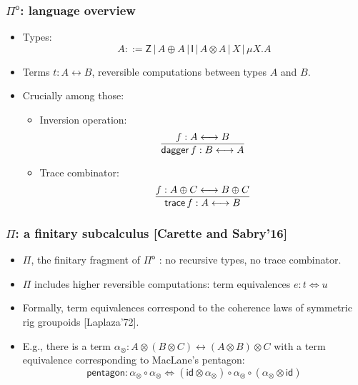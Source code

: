 \documentclass[12pt,t]{beamer}
\newcommand{\Pio}{\ensuremath{\mathsf{\Pi}^{\mathsf{o}}}}
\newcommand{\id}{\mathsf{id}}
\newcommand{\lr}{\longleftrightarrow}
\newcommand{\trace}{\ensuremath{\mathsf{trace}}}
\newcommand{\Z}{\mathsf{Z}}
\newcommand{\I}{\mathsf{I}}
\newcommand{\LR}{\iff}
\renewcommand{\dagger}{\mathsf{dagger}}
\begin{document}
\begin{frame}

  \frametitle{\Pio: language overview}

  \begin{itemize}

  \item Types:
    \[
    A ::= \Z \, | \,A \oplus A \, | \,\I \,| \,A \otimes A \,| \,X \,|
    \,\mu X.A
    \]
  \item Terms $t : A \lr B$, reversible computations between types $A$
    and $B$.
  \item Crucially among those:
    \begin{itemize}          
    \item Inversion operation:
      \[
      \infer{\dagger \,f : B \lr A}{f : A \lr B}
      \]
    \item Trace combinator:
      \[
      \infer{\trace \,f: A \lr B}{f : A \oplus C \lr B \oplus C}
      \]
    \end{itemize}    
  \end{itemize}
  
\end{frame}


\begin{frame}

  \frametitle{$\Pi$: a finitary subcalculus [Carette and Sabry'16]}

  \begin{itemize}

  \item $\Pi$, the finitary fragment of $\Pio$ : no recursive types,
    no trace combinator.

  \item $\Pi$ includes higher reversible computations: term
    equivalences $e : t \LR u$
  \item Formally, term equivalences correspond to the coherence laws of
    symmetric rig groupoids [Laplaza'72].
  \item E.g., there is a term $\alpha_{\otimes} : A \otimes (B \otimes
    C) \lr (A \otimes B) \otimes C$ with a term equivalence
    corresponding to MacLane's pentagon:
    \[
    \mathsf{pentagon} : \alpha_{\otimes} \circ \alpha_{\otimes} \LR (\id \otimes
    \alpha_{\otimes}) \circ \alpha_{\otimes} \circ (\alpha_{\otimes}
    \otimes \id)
    \]
    
  \end{itemize}
  
\end{frame}
\end{document}
